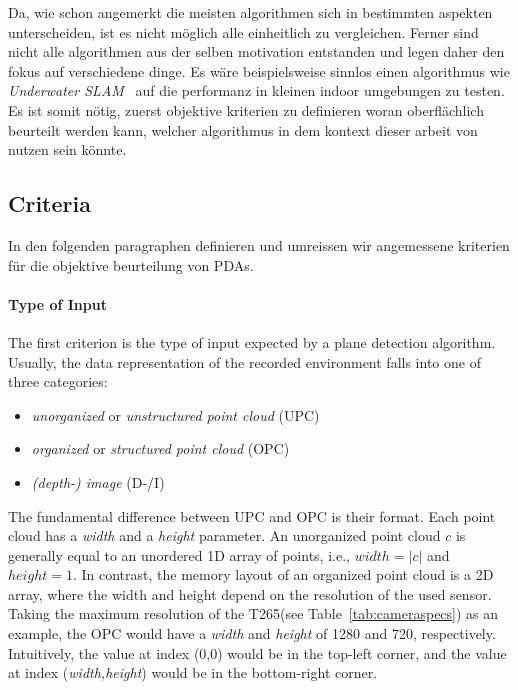 \documentclass[main.tex]{subfiles}
\begin{document}
Da, wie schon angemerkt die meisten algorithmen sich in bestimmten aspekten unterscheiden, ist es nicht möglich alle einheitlich zu vergleichen.
Ferner sind nicht alle algorithmen aus der selben motivation entstanden und legen daher den fokus auf verschiedene dinge. Es wäre beispielsweise sinnlos einen algorithmus wie
\textit{Underwater SLAM}~\cite{6913908} auf die performanz in kleinen indoor umgebungen zu testen.
Es ist somit nötig, zuerst objektive kriterien zu definieren woran oberflächlich beurteilt werden kann, welcher algorithmus in dem kontext dieser arbeit von nutzen sein könnte.


\subsection{Criteria}
In den folgenden paragraphen definieren und umreissen wir angemessene kriterien für die objektive beurteilung von PDAs.

\paragraph{Type of Input}\label{par:input}
The first criterion is the type of input expected by a plane detection algorithm.
Usually, the data representation of the recorded environment falls into one of three categories:
\begin{itemize}
    \item \textit{unorganized} or \textit{unstructured point cloud} (UPC)
    \item \textit{organized} or \textit{structured point cloud} (OPC)
    \item \textit{(depth-) image} (D-/I)
\end{itemize}

The fundamental difference between UPC and OPC is their format. Each point cloud has a \textit{width} and a \textit{height} parameter.
An unorganized point cloud $c$ is generally equal to an unordered 1D array of points, i.e., $width = |c|$ and $height=1$.
In contrast, the memory layout of an organized point cloud is a 2D array, where the width and height depend on the resolution of the used sensor.
Taking the maximum resolution of the T265(see Table~\ref{tab:cameraspecs}) as an example, the OPC would have a \textit{width} and \textit{height} of
1280 and 720, respectively.
Intuitively, the value at index (0,0) would be in the top-left corner, and the value at index (\textit{width,height}) would be in the bottom-right corner.
\end{document}
